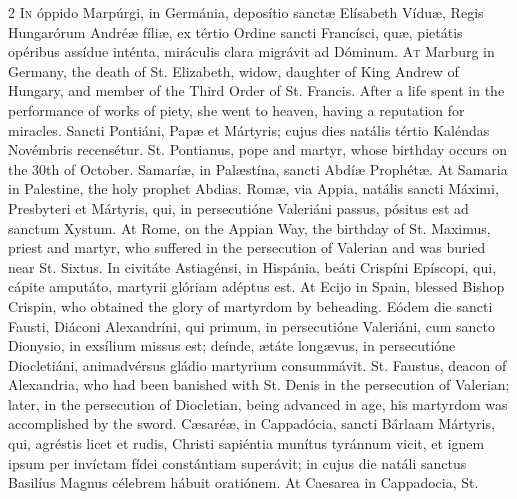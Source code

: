\begin{paracol}{2}
\lettrine[lines=2]{I}{n} óppido Marpúrgi, in 
 Germánia, deposítio sanctæ Elísabeth Víduæ, Regis Hungarórum Andréæ fíliæ, 
 ex tértio Ordine sancti Francísci, quæ, pietátis opéribus assídue inténta, 
 miráculis clara migrávit ad Dóminum.
\switchcolumn
{}
\lettrine[lines=2]{A}{t} Marburg in Germany, the death of 
 St. Elizabeth, widow, daughter of King Andrew of Hungary, and member of the 
 Third Order of St. Francis. After a life spent in the performance of 
 works of piety, she went to heaven, having a reputation for miracles.
\switchcolumn*
{}
Sancti Pontiáni, Papæ 
 et Mártyris; cujus dies natális tértio Kaléndas Novémbris recensétur.
\switchcolumn
{}
St. Pontianus, pope and martyr, whose 
 birthday occurs on the 30th of October.
\switchcolumn*
{}
Samaríæ, in Palæstína, 
 sancti Abdíæ Prophétæ.
\switchcolumn
{}
At Samaria in Palestine, the holy 
 prophet Abdias.
\switchcolumn*
{}
Romæ, via Appia, 
 natális sancti Máximi, Presbyteri et Mártyris, qui, in persecutióne 
 Valeriáni passus, pósitus est ad sanctum Xystum.
\switchcolumn
{}
At Rome, on the Appian Way, the 
 birthday of St. Maximus, priest and martyr, who suffered in the persecution 
 of Valerian and was buried near St. Sixtus.
\switchcolumn*
{}
In civitáte Astiagénsi, 
 in Hispánia, beáti Crispíni Epíscopi, qui, cápite amputáto, martyrii glóriam 
 adéptus est.
\switchcolumn
{}
At Ecijo in Spain, blessed Bishop 
 Crispin, who obtained the glory of martyrdom by beheading.
\switchcolumn*
{}
Eódem die sancti Fausti, 
 Diáconi Alexandríni, qui primum, in persecutióne Valeriáni, cum sancto 
 Dionysio, in exsílium missus est; deínde, ætáte longævus, in persecutióne 
 Diocletiáni, animadvérsus gládio martyrium consummávit.
\switchcolumn
{}
St. Faustus, deacon of Alexandria, 
 who had been banished with St. Denis in the persecution of Valerian; later, 
 in the persecution of Diocletian, being advanced in age, his martyrdom was 
 accomplished by the sword.
\switchcolumn*
{}
Cæsaréæ, in Cappadócia, sancti Bárlaam Mártyris, qui, agréstis licet et rudis, Christi sapiéntia 
 munítus tyránnum vicit, et ignem ipsum per invíctam fídei constántiam 
 superávit; in cujus die natáli sanctus Basilíus Magnus célebrem hábuit 
 oratiónem.
\switchcolumn
{}
At Caesarea in Cappadocia, St. 

\end{paracol}
